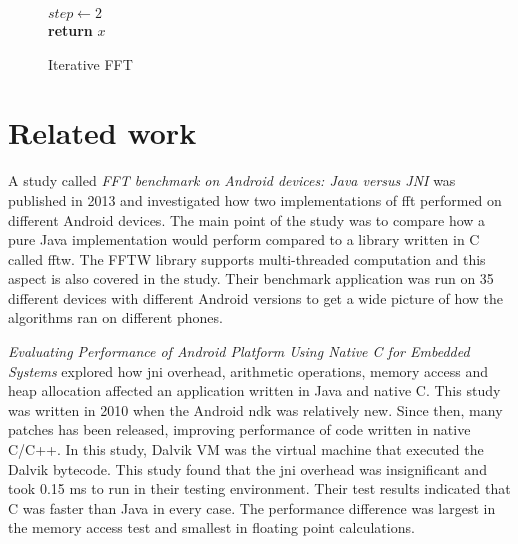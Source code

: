 \ifrelease
\begin{figure}[H]
    \begin{algorithm}[H]


        $step \gets 2$\\
        \textbf{return} $x$
        \caption{Iterative FFT}
        \label{alg:fft}
    \end{algorithm}
\end{figure}
\fi

\newpage
\section{Related work}
A study called \emph{FFT benchmark on Android devices: Java versus JNI} \cite{Jr2013} was published in 2013 and investigated how two implementations of \gls{fft} performed on different Android devices. The main point of the study was to compare how a pure Java implementation would perform compared to a library written in C called \gls{fftw}. The FFTW library supports multi-threaded computation and this aspect is also covered in the study. Their benchmark application was run on 35 different devices with different Android versions to get a wide picture of how the algorithms ran on different phones.

\emph{Evaluating Performance of Android Platform Using Native C for Embedded Systems} \cite{Lee2010} explored how \gls{jni} overhead, arithmetic operations, memory access and heap allocation affected an application written in Java and native C. This study was written in 2010 when the Android \gls{ndk} was relatively new. Since then, many patches has been released, improving performance of code written in native C/C++. In this study, Dalvik VM was the virtual machine that executed the Dalvik bytecode. This study found that the \gls{jni} overhead was insignificant and took 0.15 ms to run in their testing environment. Their test results indicated that C was faster than Java in every case. The performance difference was largest in the memory access test and smallest in floating point calculations.

